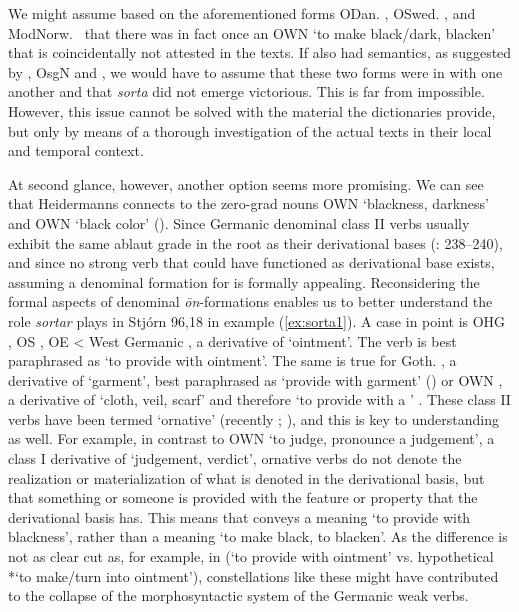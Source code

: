 \documentclass[output=paper,colorlinks,citecolor=brown]{langscibook}
\begin{document}
We might assume based on the aforementioned forms ODan. , OSwed. , and ModNorw.\  that there was in fact once an OWN   ‘to make black/dark, blacken’ that is coincidentally not attested in the texts. If  also had  semantics, as suggested by , OsgN and , we would have to assume that these two forms were in  with one another and that \textit{sorta} did not emerge victorious. This is far from impossible. However, this issue cannot be solved with the material the dictionaries provide, but only by means of a thorough investigation of the actual texts in their local and temporal context.

At second glance, however, another option seems more promising. We can see that Heidermanns connects  to the zero-grad nouns OWN  ‘blackness, darkness’ and OWN  ‘black color’ (). Since Germanic denominal  class II verbs usually exhibit the same ablaut grade in the root as their derivational bases (\citealt{KraheMeid1969}: 238–240), and since no strong verb that could have functioned as derivational base exists, assuming a denominal  formation for  is formally appealing. Reconsidering the formal aspects of denominal \textit{ōn}-formations  enables us to better understand the role \textit{sortar}  plays in Stjórn 96,18 in example (\ref{ex:sorta1}). A case in point is OHG , OS , OE  < West Germanic , a derivative of  ‘ointment’. The verb is best paraphrased as ‘to provide with ointment’. The same is true for Goth. , a derivative of  ‘garment’, best paraphrased as ‘provide with garment’ (\citealt[239]{KraheMeid1969}) or OWN , a derivative of  ‘cloth, veil, scarf’ and therefore ‘to provide with a ’ \citep[178]{Iversen1923}. These class II verbs have been termed ‘ornative’ (recently \citealt[250]{Filatkina2018}; \citealt[376--378]{Schaefer1984}), and this is key to understanding  as well. For example, in contrast to OWN  ‘to judge, pronounce a judgement’, a class I derivative of  ‘judgement, verdict’, ornative verbs do not denote the realization or materialization of what is denoted in the derivational basis, but that something or someone is provided with the feature or property that the derivational basis has. This means that  conveys a meaning ‘to provide with blackness’, rather than a meaning ‘to make black, to blacken’. As the difference is not as clear cut as, for example, in  (‘to provide with ointment’ vs. hypothetical *‘to make/turn into ointment’), constellations like these might have contributed to the collapse of the morphosyntactic system of the Germanic weak verbs. 
\end{document}

